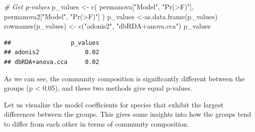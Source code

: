 \documentclass[
]{book}
\newenvironment{Shaded}{\begin{snugshade}}{\end{snugshade}}
\newcommand{\AttributeTok}[1]{\textcolor[rgb]{0.77,0.63,0.00}{#1}}
\newcommand{\CommentTok}[1]{\textcolor[rgb]{0.56,0.35,0.01}{\textit{#1}}}
\newcommand{\ConstantTok}[1]{\textcolor[rgb]{0.00,0.00,0.00}{#1}}
\newcommand{\DecValTok}[1]{\textcolor[rgb]{0.00,0.00,0.81}{#1}}
\newcommand{\FunctionTok}[1]{\textcolor[rgb]{0.00,0.00,0.00}{#1}}
\newcommand{\NormalTok}[1]{#1}
\newcommand{\OtherTok}[1]{\textcolor[rgb]{0.56,0.35,0.01}{#1}}
\newcommand{\SpecialCharTok}[1]{\textcolor[rgb]{0.00,0.00,0.00}{#1}}
\newcommand{\StringTok}[1]{\textcolor[rgb]{0.31,0.60,0.02}{#1}}
\begin{document}
\begin{Shaded}
\begin{Highlighting}[]
\CommentTok{\# Get p{-}values}
\NormalTok{p\_values }\OtherTok{\textless{}{-}} \FunctionTok{c}\NormalTok{( permanova[}\StringTok{"Model"}\NormalTok{, }\StringTok{"Pr(\textgreater{}F)"}\NormalTok{], permanova2[}\StringTok{"Model"}\NormalTok{, }\StringTok{"Pr(\textgreater{}F)"}\NormalTok{] )}
\NormalTok{p\_values }\OtherTok{\textless{}{-}}\FunctionTok{as.data.frame}\NormalTok{(p\_values)}
\FunctionTok{rownames}\NormalTok{(p\_values) }\OtherTok{\textless{}{-}} \FunctionTok{c}\NormalTok{(}\StringTok{"adonis2"}\NormalTok{, }\StringTok{"dbRDA+anova.cca"}\NormalTok{)}
\NormalTok{p\_values}
\end{Highlighting}
\end{Shaded}

\begin{verbatim}
##                 p_values
## adonis2             0.02
## dbRDA+anova.cca     0.02
\end{verbatim}

As we can see, the community composition is significantly different
between the groups (p \textless{} 0.05), and these two methods give equal p-values.

Let us visualize the model coefficients for species that exhibit the
largest differences between the groups. This gives some insights into
how the groups tend to differ from each other in terms of community
composition.

\begin{Shaded}
\end{Shaded}
\end{document}
